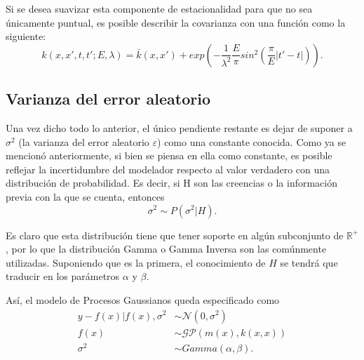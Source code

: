 Si se desea suavizar esta componente de estacionalidad para que no sea \'unicamente puntual, es posible describir la covarianza con una funci\'on como la siguiente:
\begin{equation*}
    k(x,x',t,t';E,\lambda) = 
    \bar{k}(x,x') + 
    exp\left(-\frac{1}{\lambda^2}\frac{E}{\pi}sin^2\left(\frac{\pi}{E}|t'-t|\right)\right).
\end{equation*}

\subsection{Varianza del error aleatorio}

Una vez dicho todo lo anterior, el \'unico pendiente restante es dejar de suponer a $\sigma^2$ (la varianza del error aleatorio $\varepsilon$) como una constante conocida. Como ya se mencion\'o anteriormente, si bien se piensa en ella como constante, es posible reflejar la incertidumbre del modelador respecto al valor verdadero con una distribuci\'on de probabilidad. Es decir, si H son las creencias o la informaci\'on previa con la que se cuenta, entonces
\begin{equation*}
    \sigma^2 \sim P(\sigma^2 | H).
\end{equation*}

Es claro que esta distribuci\'on tiene que tener soporte en alg\'un subconjunto de $\mathbb{R^+}$, por lo que la distribuci\'on Gamma o Gamma Inversa son las com\'unmente utilizadas. Suponiendo que es la primera, el conocimiento de $H$ se tendr\'a que traducir en los par\'ametros $\alpha$ y $\beta$.

As\'i, el modelo de Procesos Gaussianos queda especificado como
\begin{equation*}
\begin{aligned}
    y - f(x) | f(x), \sigma^2 &\sim \mathcal{N}(0,\sigma^2) \\
    f(x) &\sim \mathcal{GP}(m(x),k(x,x)) \\
    \sigma^2 &\sim Gamma(\alpha,\beta).
\end{aligned}
\end{equation*}

\newpage